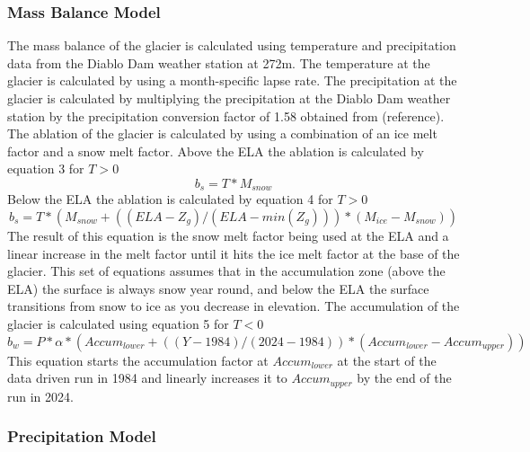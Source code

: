 \documentclass{article}
\begin{document}
\subsubsection{Mass Balance Model}
The mass balance of the glacier is calculated using temperature and precipitation data from the Diablo Dam weather station at 272m. The 
temperature at the glacier is calculated by using a month-specific lapse rate. 
The precipitation at the glacier is calculated by multiplying the precipitation at the Diablo Dam weather station by the precipitation conversion factor of 1.58 
obtained from (reference). The ablation of the glacier is calculated by using a combination of an ice melt factor and a snow melt factor. Above the ELA the 
ablation is calculated by equation 3 for $T>0$
\begin{equation}b_s=T*M_{snow}\end{equation}
Below the ELA the ablation is calculated by equation 4 for $T>0$
\begin{equation}b_s=T*(M_{snow}+((ELA-Z_g)/(ELA-min(Z_g)))*(M_{ice}-M_{snow}))\end{equation}
The result of this equation is the snow melt factor being used at the ELA and a linear increase in the melt factor until it hits the ice melt 
factor at the base of the glacier. This set of equations assumes that in the accumulation zone (above the ELA) the surface is always snow year 
round, and below the ELA the surface transitions from snow to ice as you decrease in elevation.
The accumulation of the glacier is calculated using equation 5 for $T<0$
\begin{equation}b_w=P*\alpha*({Accum}_{lower}+((Y-1984)/(2024-1984))*({Accum}_{lower}-{Accum}_{upper}))\end{equation}
This equation starts the accumulation factor at $Accum_{lower}$ at the start of the data driven run in 1984 and linearly increases it to $Accum_{upper}$ by the end 
of the run in 2024.

\subsubsection{Precipitation Model}
\end{document}
